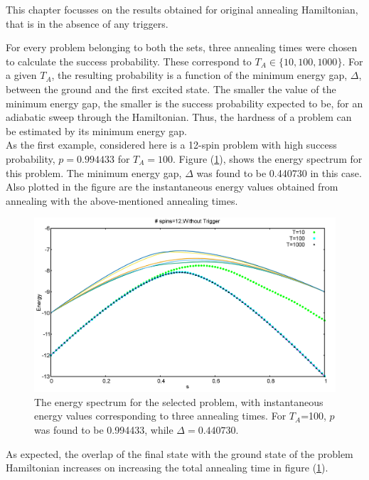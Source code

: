 \documentclass[12]{article}
\begin{document}
This chapter focusses on the results obtained for original annealing Hamiltonian, that is in the absence of any triggers. 


For every problem belonging to both the sets, three annealing times were chosen to calculate the success probability. These correspond to $T_A \in \{ 10,100,1000 \}$. For a given $T_A$, the resulting probability is a function of the minimum energy gap, $\Delta$, between the ground and the first excited state. The smaller the value of the minimum energy gap, the smaller is the success probability expected to be, for an adiabatic sweep through the Hamiltonian. Thus, the hardness of a problem can be estimated by its minimum energy gap.\\


As the first example, considered here is a 12-spin problem with high success probability, $p=0.994433$ for $T_A=100$. Figure (\ref{fig:o2}), shows the energy spectrum for this problem. The minimum energy gap, $\Delta$ was found to be 0.440730 in this case.  Also plotted in the figure are the instantaneous energy values obtained from annealing with the above-mentioned annealing times.
\begin{figure}[H]
\centering 
\includegraphics[scale=0.3]{733_s12_O.png}
\caption{The energy spectrum for the selected problem, with instantaneous energy values corresponding to three annealing times. For $T_A$=100, $p$ was found to be 0.994433, while $\Delta=0.440730.$}
\label{fig:o2}
\end{figure}

As expected, the overlap of the final state with the ground state of the problem Hamiltonian increases on increasing the total annealing time in figure (\ref{fig:o2}).\\
\end{document}
